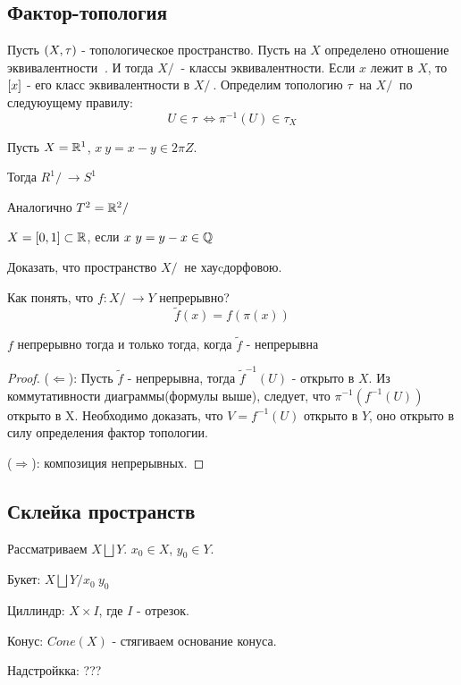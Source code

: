 \subsection{Фактор-топология}

Пусть $\left(X, \tau\right)$ - топологическое пространство. Пусть на $X$ определено отношение эквивалентности $~$. И тогда $X/~$ - классы эквивалентности.
Если $x$ лежит в $X$, то $\left[x\right]$ - его класс эквивалентности в $X/~$. Определим топологию $\tau_{~}$ на $X/~$ по следуюущему правилу:
\[
    U \in \tau_{~} \Leftrightarrow \pi^{-1}(U) \in \tau_X
\]

\begin{example}
    Пусть $X = \mathbb{R}^1$, $x ~ y = x - y \in 2\pi Z$.

    Тогда $R^1/~ \rightarrow S^1$

    Аналогично $T^2 = \mathbb{R}^2/~$
\end{example}

\begin{example}
    $X = [0, 1] \subset \mathbb{R}$, если $x ~ y = y - x \in \mathbb{Q}$

    \begin{exercise}
        Доказать, что пространство $X/~$ не хауcдорфовою.
    \end{exercise}
\end{example}

Как понять, что $f: X/~ \rightarrow Y$ непрерывно?
\[
    \widetilde{f}(x) = f(\pi(x))
\]
\begin{theorem}
    $f$ непрерывно тогда и только тогда, когда $\widetilde{f}$ - непрерывна
\end{theorem}
\begin{proof}
    ($\Leftarrow$): Пусть $\widetilde{f}$ - непрерывна, тогда $\widetilde{f}^{-1}(U)$ - открыто в $X$. Из коммутативности диаграммы(формулы выше), следует, что $\pi^{-1}(f^{-1}(U))$ открыто в X. Необходимо доказать, что $V = f^{-1}(U)$ открыто в $Y$, оно открыто в силу определения фактор топологии.

    ($\Rightarrow$): композиция непрерывных.
\end{proof}

\subsection{Склейка пространств}

Рассматриваем $X \bigsqcup Y$. $x_0 \in X$, $y_0 \in Y$.
\begin{definition}
    Букет: $X \bigsqcup Y / x_0 ~ y_0$

    Циллиндр: $X \times I$, где $I$ - отрезок.

    Конус: $Cone(X)$ - стягиваем основание конуса.

    Надстройкка: ???
\end{definition} 

